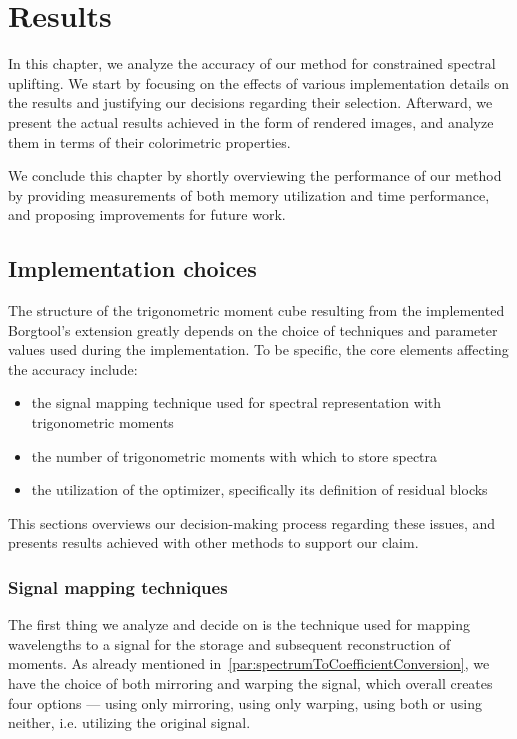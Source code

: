 \chapter{Results} \label{chap:results}

In this chapter, we analyze the accuracy of our method for constrained spectral uplifting. We start by focusing on the effects of various implementation details on the results and justifying our decisions regarding their selection. Afterward, we present the actual results achieved in the form of rendered images, and analyze them in terms of their colorimetric properties.

We conclude this chapter by shortly overviewing the performance of our method by providing measurements of both memory utilization and time performance, and proposing improvements for future work.

\section{Implementation choices}

The structure of the trigonometric moment cube resulting from the implemented Borgtool's extension greatly depends on the choice of techniques and parameter values used during the implementation. To be specific, the core elements affecting the accuracy include:
\begin{itemize}
	\item the signal mapping technique used for spectral representation with trigonometric moments
	\item the number of trigonometric moments with which to store spectra
	\item the utilization of the optimizer, specifically its definition of residual blocks
\end{itemize}

This sections overviews our decision-making process regarding these issues, and presents results achieved with other methods to support our claim.

\subsection{Signal mapping techniques} \label{sec:storingMoments}
The first thing we analyze and decide on is the technique used for mapping wavelengths to a signal for the storage and subsequent reconstruction of moments. As already mentioned in~\cref{par:spectrumToCoefficientConversion}, we have the choice of both mirroring and warping the signal, which overall creates four options --- using only mirroring, using only warping, using both or using neither, i.e. utilizing the original signal.

